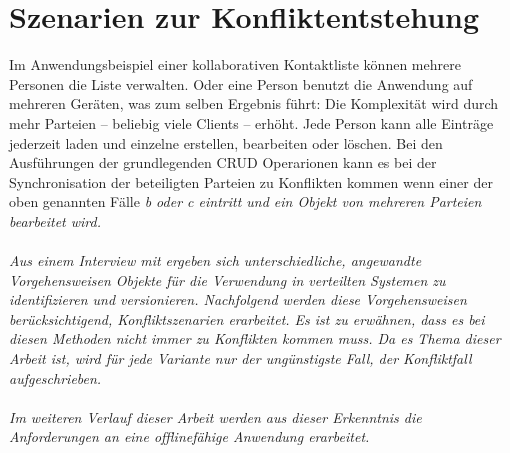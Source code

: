 \section{\label{chap:konfliktszenarien}Szenarien zur Konfliktentstehung}
Im Anwendungsbeispiel einer kollaborativen Kontaktliste können mehrere Personen die Liste verwalten. Oder eine Person benutzt die Anwendung auf mehreren Geräten, was zum selben Ergebnis führt:
Die Komplexität wird durch mehr Parteien -- beliebig viele Clients -- erhöht.
Jede Person kann alle Einträge jederzeit laden und einzelne erstellen, bearbeiten oder löschen. Bei den Ausführungen der grundlegenden \gls{CRUD} Operarionen kann es bei der Synchronisation der beteiligten Parteien zu Konflikten kommen wenn einer der oben genannten Fälle \it{b} oder \it{c} eintritt und ein Objekt von mehreren Parteien bearbeitet wird.\\\\
Aus einem Interview mit  ergeben sich unterschiedliche, angewandte Vorgehensweisen Objekte für die Verwendung in verteilten Systemen zu identifizieren und versionieren. Nachfolgend werden diese Vorgehensweisen berücksichtigend, Konfliktszenarien erarbeitet. Es ist zu erwähnen, dass es bei diesen Methoden nicht immer zu Konflikten kommen muss. Da es Thema dieser Arbeit ist, wird für jede Variante nur der ungünstigste Fall, der Konfliktfall aufgeschrieben.
%
\\\\
Im weiteren Verlauf dieser Arbeit werden aus dieser Erkenntnis die Anforderungen an eine offlinefähige Anwendung erarbeitet.